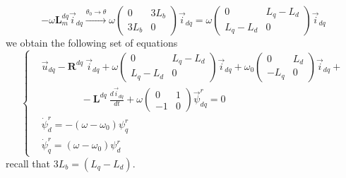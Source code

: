 \documentclass[11pt,a4paper,oneside]{book}
\numberwithin{equation}{section}
\theoremstyle{it}
\theoremstyle{definition}
\begin{document}
$$-\omega\mathbf{L}_m^{dq}\vec{i}_{dq}
\xrightarrow{\theta_0\rightarrow\theta} \omega\begin{pmatrix} 0 & 3L_b\\ 
	3L_b & 0 \end{pmatrix}\vec{i}_{dq} = \omega\begin{pmatrix} 0 & L_q-L_d\\ 
	L_q-L_d & 0 \end{pmatrix}\vec{i}_{dq}$$
we obtain the following set of equations  
\begin{equation}\label{eqdq}
	\left\lbrace \begin{aligned}
		& \vec{u}_{dq}-\mathbf{R}^{dq}\ \vec{i}_{dq} + 
		\omega\begin{pmatrix} 0 & L_q-L_d\\ L_q-L_d & 0 
		\end{pmatrix}\vec{i}_{dq} + \omega_0\begin{pmatrix} 0 & L_d\\ -L_q 
			& 0 \end{pmatrix}\vec{i}_{dq} + \\[6pt]
		&\qquad\qquad-\mathbf{L}^{dq}\ \frac{d\vec{i}_{dq}}{dt} + 
		\omega\begin{pmatrix} 0 & 1\\-1 & 0 \end{pmatrix}\vec{\psi}_{dq}^r 
		= 0\\[6pt]
		& \dot{\psi}_d^r = -\left( \omega-\omega_0\right)\psi_q^r \\[6pt]
		&\dot{\psi}_q^r = \left( \omega-\omega_0\right)\psi_d^r 
	\end{aligned} \right. 
\end{equation}
recall that $3L_b=(L_q-L_d)$.
\end{document}
